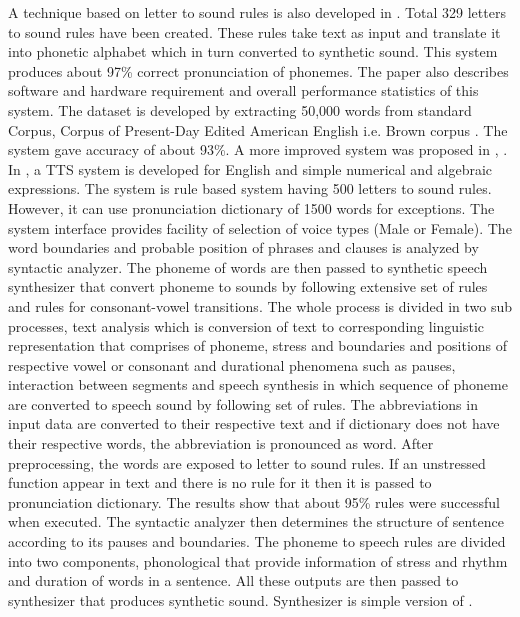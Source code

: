 A technique based on letter to sound rules is also developed in \cite{elovitz1976automatic}. Total 329 letters to sound rules have
been created. These rules take text as input and translate it into phonetic alphabet which in turn converted to synthetic sound.
This system produces about 97\% correct pronunciation of phonemes. The paper also describes software and hardware
requirement and overall performance statistics of this system. The dataset is developed by extracting
50,000 words from standard Corpus, Corpus of Present-Day Edited American English i.e. Brown
corpus \cite{ku1967computational}. The system gave accuracy of about 93\%. A more
improved system was proposed in \cite{carlson1982multi}, \cite{klatt1982klattalk}. 
In \cite{klatt1982klattalk}, a TTS system is developed for English and simple numerical and algebraic expressions. 
The system is rule based system having 500 letters to sound rules. However, it can use pronunciation dictionary of 1500 words for exceptions. 
The system interface provides facility of selection of voice types (Male or Female). The word boundaries and probable
position of phrases and clauses is analyzed by syntactic analyzer. The phoneme of words are then passed to synthetic speech
synthesizer that convert phoneme to sounds by following extensive set of rules and rules for consonant-vowel transitions. 
The whole process is divided in two sub processes, text analysis which is conversion of text to
corresponding linguistic representation that comprises of phoneme, stress and boundaries and positions of respective vowel
or consonant and durational phenomena such as pauses, interaction between segments \cite{klatt1979synthesis} and speech synthesis 
in which sequence of phoneme are converted to speech sound by following set of rules. The abbreviations in input data 
are converted to their respective text and if dictionary does not have their respective
words, the abbreviation is pronounced as word. After preprocessing, the words are exposed to letter to sound rules. If an unstressed function appear in text and
there is no rule for it then it is passed to pronunciation dictionary. The results show that about 95\% rules were successful
when executed. The syntactic analyzer then determines the structure of sentence according to its pauses and boundaries. The phoneme to speech rules
are divided into two components, phonological that provide information of stress and rhythm and duration of words in a sentence.
All these outputs are then passed to synthesizer that produces synthetic sound. Synthesizer is simple version of \cite{klatt1980software}.


